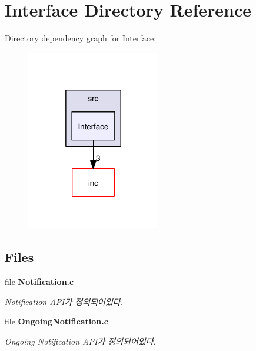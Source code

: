 \section{Interface Directory Reference}
\label{dir_8d70c067bb05a7a28022704ef2db23b5}
Directory dependency graph for Interface\-:
\nopagebreak
\begin{figure}[H]
\begin{center}
\leavevmode
\includegraphics[width=166pt]{dir_8d70c067bb05a7a28022704ef2db23b5_dep}
\end{center}
\end{figure}
\subsection*{Files}
\begin{DoxyCompactItemize}
\item 
file {\bf Notification.\-c}
\begin{DoxyCompactList}\small\item\em Notification A\-P\-I가 정의되어있다. \end{DoxyCompactList}\item 
file {\bf Ongoing\-Notification.\-c}
\begin{DoxyCompactList}\small\item\em Ongoing Notification A\-P\-I가 정의되어있다. \end{DoxyCompactList}\end{DoxyCompactItemize}
